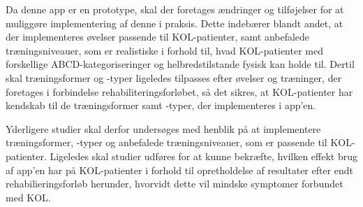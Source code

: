 Da denne app er en prototype, skal der foretages ændringer og tilføjelser for at muliggøre implementering af denne i praksis. Dette indebærer blandt andet, at der implementeres øvelser passende til KOL-patienter, samt anbefalede træningsniveauer, som er realistiske i forhold til, hvad KOL-patienter med forskellige ABCD-kategoriseringer og helbredstilstande fysisk kan holde til. Dertil skal træningsformer og -typer ligeledes tilpasses efter øvelser og træninger, der foretages i forbindelse rehabiliteringsforløbet, så det sikres, at KOL-patienter har kendskab til de træningsformer samt -typer, der implementeres i app’en. 

Yderligere studier skal derfor undersøges med henblik på at implementere træningsformer, -typer og anbefalede træningsniveauer, som er passende til KOL-patienter. Ligeledes skal studier udføres for at kunne bekræfte, hvilken effekt brug af app’en har på KOL-patienter i forhold til opretholdelse af resultater efter endt rehabilieringsforløb herunder, hvorvidt dette vil mindske symptomer forbundet med KOL. 
